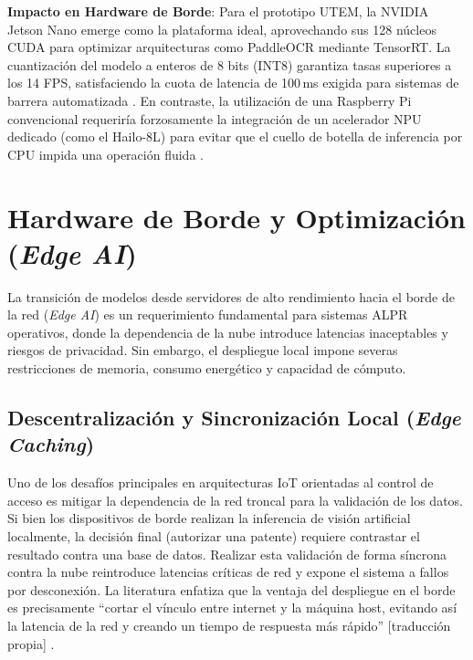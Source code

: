 \textbf{Impacto en Hardware de Borde}: 
Para el prototipo UTEM, la NVIDIA Jetson Nano emerge como la plataforma ideal, aprovechando 
sus 128 núcleos CUDA para optimizar arquitecturas como PaddleOCR mediante TensorRT. 
La cuantización del modelo a enteros de 8 bits (INT8) garantiza tasas superiores a los 
14 FPS, satisfaciendo la cuota de latencia de 100\,ms exigida para sistemas de barrera 
automatizada \parencite{sonnaraEfficientRealtimeLicense2025, swatiEfficientDeepLearning2024, xuDeepLearningAlgorithms2026c}. 
En contraste, la utilización de una Raspberry Pi convencional requeriría forzosamente la 
integración de un acelerador NPU dedicado (como el Hailo-8L) para evitar que el cuello 
de botella de inferencia por CPU impida una operación fluida 
\parencite{sonnaraEfficientRealtimeLicense2025, xuDeepLearningAlgorithms2026c}.


\section{Hardware de Borde y Optimización (\textit{Edge AI})}

La transición de modelos desde servidores de alto rendimiento hacia el borde de la 
red (\textit{Edge AI}) es un requerimiento fundamental para sistemas ALPR operativos, 
donde la dependencia de la nube introduce latencias inaceptables y riesgos de privacidad. 
Sin embargo, el despliegue local impone severas restricciones de memoria, consumo 
energético y capacidad de cómputo.

\subsection{Descentralización y Sincronización Local (\textit{Edge Caching})}

Uno de los desafíos principales en arquitecturas IoT orientadas al control de acceso es mitigar la dependencia de la red troncal para la validación de los datos. Si bien los dispositivos de borde realizan la inferencia de visión artificial localmente, la decisión final (autorizar una patente) requiere contrastar el resultado contra una base de datos. Realizar esta validación de forma síncrona contra la nube reintroduce latencias críticas de red y expone el sistema a fallos por desconexión. La literatura enfatiza que la ventaja del despliegue en el borde es precisamente ``cortar el vínculo entre internet y la máquina host, evitando así la latencia de la red y creando un tiempo de respuesta más rápido'' [traducción propia] \parencite{swatiEfficientDeepLearning2024}.

